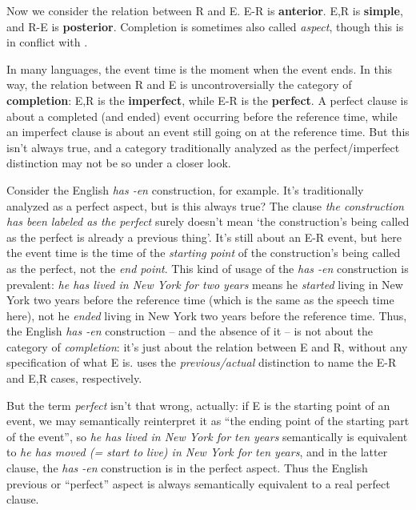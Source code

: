 \documentclass[UTF8, a4paper, oneside, scheme=plain]{ctexart}
\newcommand*{\concept}[1]{\textbf{#1}}
\newcommand*{\term}[1]{\emph{#1}}
\newcommand*{\corpus}[1]{\emph{#1}}
\newcommand*{\translate}[1]{`#1'}
\begin{document}
Now we consider the relation between R and E.
E-R is \concept{anterior}.
E,R is \concept{simple},
and R-E is \concept{posterior}.
Completion is sometimes also called \term{aspect},
though this is in conflict with .

In many languages, the event time is the moment when the event ends.
In this way, the relation between R and E
is uncontroversially the category of \concept{completion}:
E,R is the \concept{imperfect},
while E-R is the \concept{perfect}.
A perfect clause is about a completed (and ended) event occurring before the reference time,
while an imperfect clause is about an event still going on at the reference time.
But this isn't always true,
and a category traditionally analyzed as the perfect/imperfect distinction 
may not be so under a closer look.

Consider the English \corpus{has -en} construction, for example.
It's traditionally analyzed as a perfect aspect,
but is this always true?
The clause \corpus{the construction has been labeled as the perfect}
surely doesn't mean 
\translate{the construction's being called as the perfect is already a previous thing}.
It's still about an E-R event,
but here the event time is the time of the \emph{starting point} of 
the construction's being called as the perfect,
not the \emph{end point}.
This kind of usage of the \corpus{has -en} construction is prevalent:
\corpus{he has lived in New York for two years}
means he \emph{started} living in New York two years before the reference time 
(which is the same as the speech time here),
not he \emph{ended} living in New York two years before the reference time.
Thus, the English \corpus{has -en} construction -- and the absence of it --
is not about the category of \emph{completion}:
it's just about the relation between E and R,
without any specification of what E is.
\citet[7.4.2]{dixon2005semantic} uses the 
\term{previous/actual} distinction to name the E-R and E,R cases, respectively.

But the term \term{perfect} isn't that wrong, actually:
if E is the starting point of an event,
we may semantically reinterpret it as ``the ending point of the starting part of the event'',
so \corpus{he has lived in New York for ten years} 
semantically is equivalent to 
\corpus{he has moved (= start to live) in New York for ten years},
and in the latter clause,
the \corpus{has -en} construction is in the perfect aspect.
Thus the English previous or ``perfect'' aspect 
is always semantically equivalent to a real perfect clause.
\end{document}
